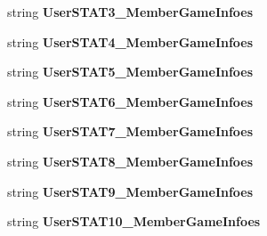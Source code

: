 \begin{DoxyCompactItemize}
\item 
string {\bfseries User\+S\+T\+A\+T3\+\_\+\+Member\+Game\+Infoes}\hypertarget{a00005_a07bdf0d9fc93bbf96a655db36ddd8cb1}{}\label{a00005_a07bdf0d9fc93bbf96a655db36ddd8cb1}

\item 
string {\bfseries User\+S\+T\+A\+T4\+\_\+\+Member\+Game\+Infoes}\hypertarget{a00005_a9cb101876c0db04dda8eb3598cca5ca1}{}\label{a00005_a9cb101876c0db04dda8eb3598cca5ca1}

\item 
string {\bfseries User\+S\+T\+A\+T5\+\_\+\+Member\+Game\+Infoes}\hypertarget{a00005_ad7a569bbec465fd060cbd4274d3833e4}{}\label{a00005_ad7a569bbec465fd060cbd4274d3833e4}

\item 
string {\bfseries User\+S\+T\+A\+T6\+\_\+\+Member\+Game\+Infoes}\hypertarget{a00005_a977c70dc07b509245c0e400363f2e18c}{}\label{a00005_a977c70dc07b509245c0e400363f2e18c}

\item 
string {\bfseries User\+S\+T\+A\+T7\+\_\+\+Member\+Game\+Infoes}\hypertarget{a00005_a5a858cbb016009786d5cda6e539fca34}{}\label{a00005_a5a858cbb016009786d5cda6e539fca34}

\item 
string {\bfseries User\+S\+T\+A\+T8\+\_\+\+Member\+Game\+Infoes}\hypertarget{a00005_a14c378b2a88cd9d2af772c4fd4971f7e}{}\label{a00005_a14c378b2a88cd9d2af772c4fd4971f7e}

\item 
string {\bfseries User\+S\+T\+A\+T9\+\_\+\+Member\+Game\+Infoes}\hypertarget{a00005_a7ab3210e44c8673127d23a939b6dffb0}{}\label{a00005_a7ab3210e44c8673127d23a939b6dffb0}

\item 
string {\bfseries User\+S\+T\+A\+T10\+\_\+\+Member\+Game\+Infoes}\hypertarget{a00005_a9c384576ae9e65f3013cc13962922817}{}\label{a00005_a9c384576ae9e65f3013cc13962922817}


\end{DoxyCompactItemize}
